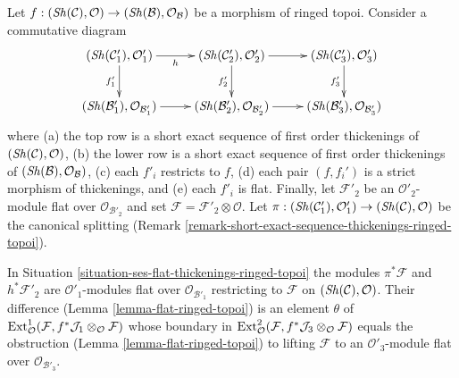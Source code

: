 \begin{situation}
\label{situation-ses-flat-thickenings-ringed-topoi}
Let $f : (\mathop{\mathit{Sh}}\nolimits(\mathcal{C}), \mathcal{O}) \to
(\mathop{\mathit{Sh}}\nolimits(\mathcal{B}), \mathcal{O}_\mathcal{B})$ be a morphism of
ringed topoi. Consider a commutative diagram
$$
\xymatrix{
(\Sh(\mathcal{C}'_1), \mathcal{O}'_1) \ar[r]_h \ar[d]_{f'_1} &
(\Sh(\mathcal{C}'_2), \mathcal{O}'_2) \ar[r] \ar[d]_{f'_2} &
(\Sh(\mathcal{C}'_3), \mathcal{O}'_3) \ar[d]_{f'_3} \\
(\Sh(\mathcal{B}'_1), \mathcal{O}_{\mathcal{B}'_1}) \ar[r] &
(\Sh(\mathcal{B}'_2), \mathcal{O}_{\mathcal{B}'_2}) \ar[r] &
(\Sh(\mathcal{B}'_3), \mathcal{O}_{\mathcal{B}'_3})
}
$$
where (a) the top row is a short exact sequence of first order thickenings
of $(\mathop{\mathit{Sh}}\nolimits(\mathcal{C}), \mathcal{O})$, (b) the lower row is a short exact
sequence of first order thickenings of
$(\mathop{\mathit{Sh}}\nolimits(\mathcal{B}), \mathcal{O}_\mathcal{B})$, (c) each $f'_i$ restricts
to $f$, (d) each pair $(f, f_i')$ is a strict morphism of thickenings, and
(e) each $f'_i$ is flat. Finally, let $\mathcal{F}'_2$ be an
$\mathcal{O}'_2$-module flat over $\mathcal{O}_{\mathcal{B}'_2}$ and
set $\mathcal{F} = \mathcal{F}'_2 \otimes \mathcal{O}$. Let
$\pi : (\mathop{\mathit{Sh}}\nolimits(\mathcal{C}'_1), \mathcal{O}'_1) \to
(\mathop{\mathit{Sh}}\nolimits(\mathcal{C}), \mathcal{O})$ be the canonical splitting
(Remark \ref{remark-short-exact-sequence-thickenings-ringed-topoi}).
\end{situation}

\begin{lemma}
\label{lemma-verify-iv-ringed-topoi}
In Situation \ref{situation-ses-flat-thickenings-ringed-topoi} the modules
$\pi^*\mathcal{F}$ and $h^*\mathcal{F}'_2$ are $\mathcal{O}'_1$-modules
flat over $\mathcal{O}_{\mathcal{B}'_1}$ restricting to $\mathcal{F}$ on
$(\mathop{\mathit{Sh}}\nolimits(\mathcal{C}), \mathcal{O})$.
Their difference (Lemma \ref{lemma-flat-ringed-topoi}) is an element
$\theta$ of
$\mathop{\mathrm{Ext}}\nolimits^1_\mathcal{O}(\mathcal{F},
f^*\mathcal{J}_1 \otimes_\mathcal{O} \mathcal{F})$
whose boundary in
$\mathop{\mathrm{Ext}}\nolimits^2_\mathcal{O}(\mathcal{F},
f^*\mathcal{J}_3 \otimes_\mathcal{O} \mathcal{F})$
equals the obstruction (Lemma \ref{lemma-flat-ringed-topoi})
to lifting $\mathcal{F}$ to an $\mathcal{O}'_3$-module flat over
$\mathcal{O}_{\mathcal{B}'_3}$.
\end{lemma}

